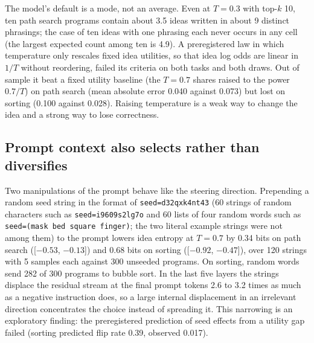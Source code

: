 \documentclass[11pt,letterpaper]{article}
\begin{document}
The model's default is a mode, not an average. Even at $T = 0.3$ with top-$k$ 10, ten path search programs contain about 3.5 ideas written in about 9 distinct phrasings; the case of ten ideas with one phrasing each never occurs in any cell (the largest expected count among ten is 4.9). A preregistered law in which temperature only rescales fixed idea utilities, so that idea log odds are linear in $1/T$ without reordering, failed its criteria on both tasks and both draws. Out of sample it beat a fixed utility baseline (the $T = 0.7$ shares raised to the power $0.7/T$) on path search (mean absolute error 0.040 against 0.073) but lost on sorting (0.100 against 0.028). Raising temperature is a weak way to change the idea and a strong way to lose correctness.

\subsection{Prompt context also selects rather than diversifies}
\label{sec:res-context}

Two manipulations of the prompt behave like the steering direction. Prepending a random seed string in the format of \texttt{seed=d32qxk4nt43} (60 strings of random characters such as \texttt{seed=i9609s2lg7o} and 60 lists of four random words such as \texttt{seed=(mask bed square finger)}; the two literal example strings were not among them) to the prompt lowers idea entropy at $T = 0.7$ by 0.34 bits on path search ([$-0.53$, $-0.13$]) and 0.68 bits on sorting ([$-0.92$, $-0.47$]), over 120 strings with 5 samples each against 300 unseeded programs. On sorting, random words send 282 of 300 programs to bubble sort. In the last five layers the strings displace the residual stream at the final prompt tokens 2.6 to 3.2 times as much as a negative instruction does, so a large internal displacement in an irrelevant direction concentrates the choice instead of spreading it. This narrowing is an exploratory finding: the preregistered prediction of seed effects from a utility gap failed (sorting predicted flip rate 0.39, observed 0.017).
\end{document}
